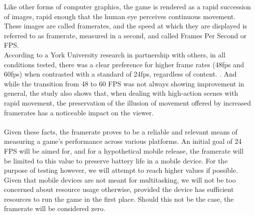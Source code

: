 Like other forms of computer graphics, the game is rendered as a rapid succession of images, rapid enough that the human eye perceives continuous movement. These images are called framerates, and the speed at which they are displayed is referred to as framerate, measured in a second, and called Frames Per Second or FPS. \\
According to a York University research in partnership with others, in all conditions tested, there was a clear preference for higher frame rates (48fps and 60fps) when contrasted with a standard of 24fps, regardless of content. \cite{fpspaper}. And while the transition from 48 to 60 FPS was not always showing improvement in general, the study also shows that, when dealing with high-action scenes with rapid movement, the preservation of the illusion of movement offered by increased framerates has a noticeable impact on the viewer. \\ \\
Given these facts, the framerate proves to be a reliable and relevant means of measuring a game's performance across various platforms. An initial goal of 24 FPS will be aimed for, and for a hypothetical mobile release, the framerate will be limited to this value to preserve battery life in a mobile device. For the purpose of testing however, we will attempt to reach higher values if possible. \\
Given that mobile devices are not meant for multitasking, we will not be too concerned about resource usage otherwise, provided the device has sufficient resources to run the game in the first place. Should this not be the case, the framerate will be considered zero.